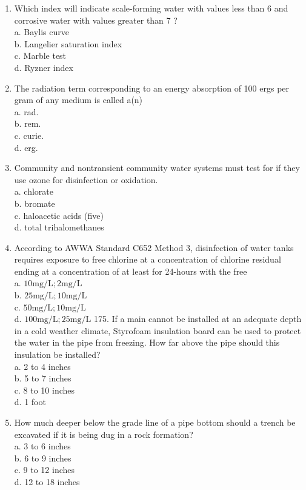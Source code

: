 \documentclass[10pt]{article}
\begin{document}
\begin{enumerate}
  \item Which index will indicate scale-forming water with values less than 6 and corrosive water with values greater than 7 ?\\
a. Baylis curve\\
b. Langelier saturation index\\
c. Marble test\\
d. Ryzner index

  \item The radiation term corresponding to an energy absorption of 100 ergs per gram of any medium is called a(n)\\
a. rad.\\
b. rem.\\
c. curie.\\
d. erg.

  \item Community and nontransient community water systems must test for if they use ozone for disinfection or oxidation.\\
a. chlorate\\
b. bromate\\
c. haloacetic acids (five)\\
d. total trihalomethanes

  \item According to AWWA Standard C652 Method 3, disinfection of water tanks requires exposure to free chlorine at a concentration of chlorine residual ending at a concentration of at least for 24-hours with the free\\
a. $10 \mathrm{mg} / \mathrm{L} ; 2 \mathrm{mg} / \mathrm{L}$\\
b. $25 \mathrm{mg} / \mathrm{L} ; 10 \mathrm{mg} / \mathrm{L}$\\
c. $50 \mathrm{mg} / \mathrm{L} ; 10 \mathrm{mg} / \mathrm{L}$\\
d. $100 \mathrm{mg} / \mathrm{L} ; 25 \mathrm{mg} / \mathrm{L}$ 175. If a main cannot be installed at an adequate depth in a cold weather climate, Styrofoam insulation board can be used to protect the water in the pipe from freezing. How far above the pipe should this insulation be installed?\\
a. 2 to 4 inches\\
b. 5 to 7 inches\\
c. 8 to 10 inches\\
d. 1 foot

  \item How much deeper below the grade line of a pipe bottom should a trench be excavated if it is being dug in a rock formation?\\
a. 3 to 6 inches\\
b. 6 to 9 inches\\
c. 9 to 12 inches\\
d. 12 to 18 inches


\end{enumerate}
\end{document}
